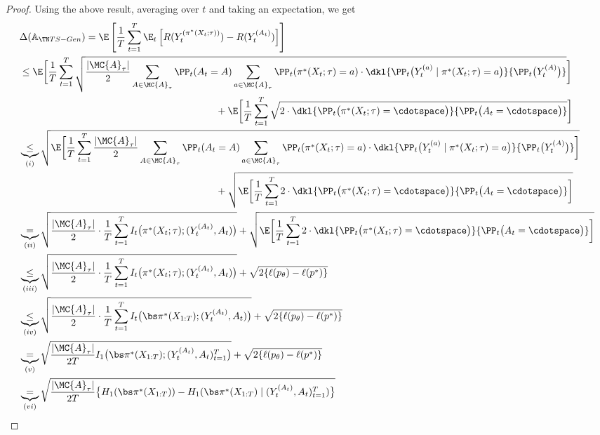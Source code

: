 \begin{proof}
Using the above result, averaging over $t$ and taking an expectation, we get
\begin{align*}
    &\Delta(\psar) 
    = \E \left[ \frac{1}{T} \sum_{t=1}^T \E_t \left[ R(Y_{t}^{(\pi^*(X_t; \tau))}) - R(Y_{t}^{(A_t)}) \right] \right] \\
    &\leq \E \bigg[ \frac{1}{T} \sum_{t=1}^T \sqrt{ \frac{|\MC{A}_{\tau}|}{2} \sum_{A \in \MC{A}_{\tau}} \PP_t(A_t = A) \sum_{a \in \MC{A}_{\tau}} \PP_t(\pi^*(X_t; \tau) = a) \cdot \dkl{ \PP_t \big( Y_t^{(a)} \mid \pi^*(X_t; \tau) = a \big) }{ \PP_t \big( Y_t^{(A)} \big) } } \bigg] \\
    &\qquad \qquad \qquad \qquad \qquad \qquad \qquad \qquad \qquad \qquad + \E \bigg[ \frac{1}{T} \sum_{t=1}^T \sqrt{ 2 \cdot \dkl{\PP_t\big(\pi^*(X_t; \tau) = \cdotspace\big)}{\PP_t \big(A_t = \cdotspace \big)} } \bigg] \\
    &\underbrace{\leq}_{(i)} \sqrt{ \E \bigg[ \frac{1}{T} \sum_{t=1}^T  \frac{|\MC{A}_{\tau}|}{2} \sum_{A \in \MC{A}_{\tau}} \PP_t(A_t = A) \sum_{a \in \MC{A}_{\tau}} \PP_t(\pi^*(X_t; \tau) = a) \cdot \dkl{ \PP_t \big( Y_t^{(a)} \mid \pi^*(X_t; \tau) = a \big) }{ \PP_t \big( Y_t^{(A)} \big) } \bigg] } \\
    &\qquad \qquad \qquad \qquad \qquad \qquad \qquad \qquad \qquad \qquad + \sqrt{ \E \bigg[ \frac{1}{T} \sum_{t=1}^T 2 \cdot \dkl{\PP_t\big(\pi^*(X_t; \tau) = \cdotspace\big)}{\PP_t \big(A_t = \cdotspace \big)} \bigg] } \\
    &\underbrace{=}_{(ii)} \sqrt{ \frac{|\MC{A}_{\tau}|}{2} \cdot \frac{1}{T} \sum_{t=1}^T I_t\big ( \pi^*(X_t; \tau); ( Y_t^{(A_t)}, A_t ) \big) }
    + \sqrt{ \E \bigg[ \frac{1}{T} \sum_{t=1}^T 2 \cdot \dkl{\PP_t\big(\pi^*(X_t; \tau) = \cdotspace\big)}{\PP_t \big(A_t = \cdotspace \big)} \bigg] } \\
    &\underbrace{\leq}_{(iii)} \sqrt{ \frac{|\MC{A}_{\tau}|}{2} \cdot \frac{1}{T} \sum_{t=1}^T I_t\big ( \pi^*(X_t; \tau); ( Y_t^{(A_t)}, A_t ) \big) }
    + \sqrt{ 2 \{ \ell(p_{\theta}) - \ell(p^*) \} } \\
    &\underbrace{\leq}_{(iv)} \sqrt{ \frac{|\MC{A}_{\tau}|}{2} \cdot \frac{1}{T} \sum_{t=1}^T I_t\big ( \piX; ( Y_t^{(A_t)}, A_t ) \big) }
    + \sqrt{ 2 \{ \ell(p_{\theta}) - \ell(p^*) \} } \\
    &\underbrace{=}_{(v)} \sqrt{ \frac{|\MC{A}_{\tau}|}{2T}  I_1\big ( \piX; ( Y_t^{(A_t)}, A_t )_{t=1}^T \big) }
    + \sqrt{ 2 \{ \ell(p_{\theta}) - \ell(p^*) \} } \\
    &\underbrace{=}_{(vi)} \sqrt{ \frac{|\MC{A}_{\tau}|}{2T} \big\{ H_1(\piX) - H_1(\piX \mid ( Y_t^{(A_t)}, A_t )_{t=1}^T) \big\} }

\end{align*}
\end{proof}
